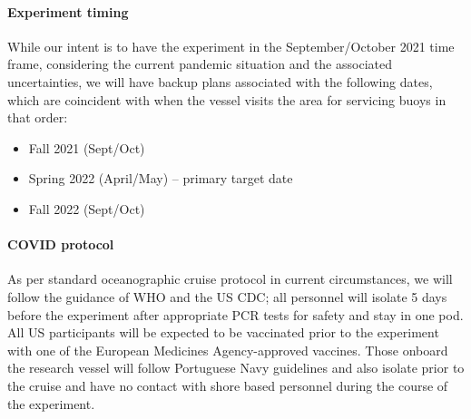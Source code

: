 \paragraph{Experiment timing} While our intent is to have the
experiment in the September/October 2021 time frame, considering the
current pandemic situation and the associated uncertainties, we will
have backup plans associated with the following dates, which are
coincident with when the \inst vessel visits the \naz area for
servicing buoys in that order:

\begin{itemize}[noitemsep,topsep=0pt,parsep=0pt,partopsep=0pt]
\vspace{+0.25cm}
\item Fall 2021 (Sept/Oct) 
\item Spring 2022 (April/May) -- primary target date
\item Fall 2022 (Sept/Oct) 

\end{itemize}  

\paragraph{COVID protocol} As per standard oceanographic cruise
protocol in current circumstances, we will follow the guidance of WHO
and the US CDC; all personnel will isolate 5 days before the
experiment after appropriate PCR tests for safety and stay in one
pod. All US participants will be expected to be vaccinated prior to
the experiment with one of the European Medicines Agency-approved
vaccines. Those onboard the \inst research vessel will follow
Portuguese Navy guidelines and also isolate prior to the cruise and
have no contact with shore based personnel during the course of the
experiment.
